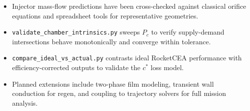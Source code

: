 \documentclass[12pt]{article}
\begin{document}
\begin{itemize}
    \item Injector mass-flow predictions have been cross-checked against classical orifice equations and spreadsheet tools for representative geometries.
    \item \verb|validate_chamber_intrinsics.py| sweeps $P_c$ to verify supply-demand intersections behave monotonically and converge within tolerance.
    \item \verb|compare_ideal_vs_actual.py| contrasts ideal RocketCEA performance with efficiency-corrected outputs to validate the $c^*$ loss model.
    \item Planned extensions include two-phase film modeling, transient wall conduction for regen, and coupling to trajectory solvers for full mission analysis.
\end{itemize}
\end{document}
